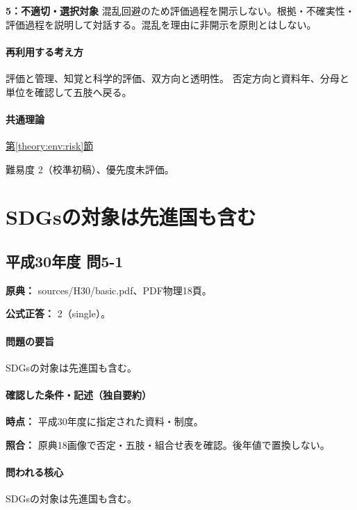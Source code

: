 \noindent\textbf{5：不適切・選択対象} 混乱回避のため評価過程を開示しない。根拠・不確実性・評価過程を説明して対話する。混乱を理由に非開示を原則とはしない。\par

\paragraph{再利用する考え方} 評価と管理、知覚と科学的評価、双方向と透明性。 否定方向と資料年、分母と単位を確認して五肢へ戻る。

\paragraph{共通理論} \hyperref[theory:env:risk]{第\ref*{theory:env:risk}節}

\par 難易度 2（校準初稿）、優先度未評価。

\section{SDGsの対象は先進国も含む}

\subsection{平成30年度 問5-1}
\label{q:h30-reg-basic-5-1}

\noindent\textbf{原典：} sources/H30/basic.pdf、PDF物理18頁。

\textbf{公式正答：} 2（single）。

\paragraph{問題の要旨} SDGsの対象は先進国も含む。

\paragraph{確認した条件・記述（独自要約）}\mbox{}\par

\noindent\textbf{時点：} 平成30年度に指定された資料・制度。\par

\noindent\textbf{照合：} 原典18画像で否定・五肢・組合せ表を確認。後年値で置換しない。\par

\paragraph{問われる核心} SDGsの対象は先進国も含む。

